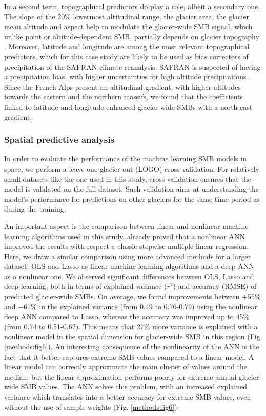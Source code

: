 In a second term, topographical predictors do play a role, albeit a secondary one. The slope of the 20\% lowermost altitudinal range, the glacier area, the glacier mean altitude and aspect help to modulate the glacier-wide SMB signal, which unlike point or altitude-dependent SMB, partially depends on glacier topography \citep{huss_conventional_2012}. Moreover, latitude and longitude are among the most relevant topographical predictors, which for this case study are likely to be used as bias correctors of precipitation of the SAFRAN climate reanalysis. SAFRAN is suspected of having a precipitation bias, with higher uncertainties for high altitude precipitations \citep{vionnet_numerical_2016}. Since the French Alps present an altitudinal gradient, with higher altitudes towards the eastern and the northern massifs, we found that the coefficients linked to latitude and longitude enhanced glacier-wide SMBs with a north-east gradient. 

\subsubsection{Spatial predictive analysis}

In order to evaluate the performance of the machine learning SMB models in space, we perform a leave-one-glacier-out (LOGO) cross-validation. For relatively small datasets like the one used in this study, cross-validation ensures that the model is validated on the full dataset. Such validation aims at understanding the model’s performance for predictions on other glaciers for the same time period as during the training. 

An important aspect is the comparison between linear and nonlinear machine learning algorithms used in this study. \citet{steiner_application_2005} already proved that a nonlinear ANN improved the results with respect a classic stepwise multiple linear regression. Here, we draw a similar comparison using more advanced methods for a larger dataset: OLS and Lasso as linear machine learning algorithms and a deep ANN as a nonlinear one. We observed significant differences between OLS, Lasso and deep learning, both in terms of explained variance (\(r^2\)) and accuracy (RMSE) of predicted glacier-wide SMBs. On average, we found improvements between +55\% and +61\% in the explained variance (from 0.49 to 0.76-0.79) using the nonlinear deep ANN compared to Lasso, whereas the accuracy was improved up to 45\% (from 0.74 to 0.51-0.62). This means that 27\% more variance is explained with a nonlinear model in the spatial dimension for glacier-wide SMB in this region (Fig. \ref{methods:fig6}). An interesting consequence of the nonlinearity of the ANN is the fact that it better captures extreme SMB values compared to a linear model. A linear model can correctly approximate the main cluster of values around the median, but the linear approximation performs poorly for extreme annual glacier-wide SMB values. The ANN solves this problem, with an increased explained variance which translates into a better accuracy for extreme SMB values, even without the use of sample weights (Fig. \ref{methods:fig6}). 

